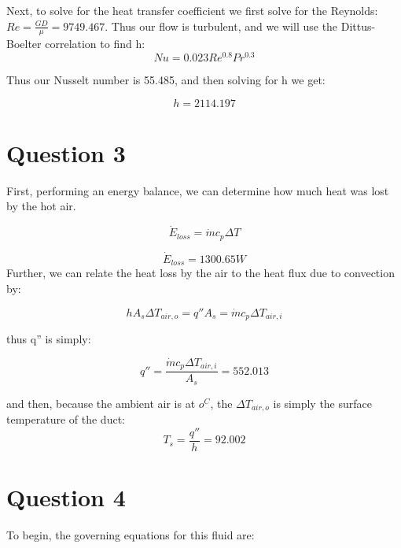 \documentclass{article}
\begin{document}
Next, to solve for the heat transfer coefficient we first solve for the Reynolds: $Re = \frac{GD}{\mu} = 9749.467$. Thus our flow is turbulent, and we will use the Dittus-Boelter correlation to find h:
\begin{equation}
    Nu = 0.023Re^{0.8}Pr^{0.3}
\end{equation}

Thus our Nusselt number is 55.485, and then solving for h we get:

\begin{equation}
    \boxed{h = 2114.197}
\end{equation}

\section{Question 3}

First, performing an energy balance, we can determine how much heat was lost by the hot air. 

\begin{equation}
    \Dot{E}_{loss} = \Dot{m}c_p\Delta T 
\end{equation}

\begin{equation}
    \boxed{\Dot{E}_{loss} = 1300.65 W}
\end{equation}
Further, we can relate the heat loss by the air to the heat flux due to convection by:

\begin{equation}
    hA_s\Delta T_{air,o} = q''A_s= \Dot{m}c_p\Delta T_{air,i}
\end{equation}

thus q'' is simply:

\begin{equation}
    \boxed{q'' = \frac{\Dot{m}c_p\Delta T_{air,i}}{A_s} = 552.013}
\end{equation}

and then, because the ambient air is at $o^C$, the $\Delta T_{air,o}$ is simply the surface temperature of the duct:
\begin{equation}
    \boxed{T_s = \frac{q''}{h} = 92.002}
\end{equation}

\section{Question 4}

To begin, the governing equations for this fluid are:
\end{document}

